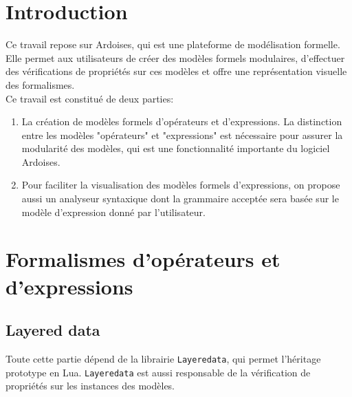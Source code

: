 \documentclass{article}
\begin{document}

\renewcommand{\contentsname}{Sommaire}
\tableofcontents
\newpage

\section{Introduction}
Ce travail repose sur Ardoises\textsuperscript{\cite{ardoises}}, 
qui est une plateforme de modélisation formelle. Elle permet aux utilisateurs de créer des modèles formels modulaires, d'effectuer des vérifications de propriétés sur ces modèles et offre une représentation visuelle des formalismes. \\

\noindent Ce travail est constitué de deux parties:
\begin{enumerate}
	\item La création de modèles formels d'opérateurs et d'expressions. La distinction entre les modèles "opérateurs" et "expressions" est nécessaire pour assurer la modularité des modèles, qui est une fonctionnalité importante du logiciel Ardoises.
	\item Pour faciliter la visualisation des modèles formels d'expressions, on propose aussi un analyseur syntaxique dont la grammaire acceptée sera basée sur le modèle d'expression donné par l'utilisateur.
\end{enumerate}

\section{Formalismes d'opérateurs et d'expressions}

\subsection{Layered data}
Toute cette partie dépend de la librairie \lstinline|Layeredata|\textsuperscript{\cite{layeredata}},
qui permet l'héritage prototype en Lua. \lstinline|Layeredata| est aussi responsable de la vérification de propriétés sur les instances des modèles. \\
\end{document}

